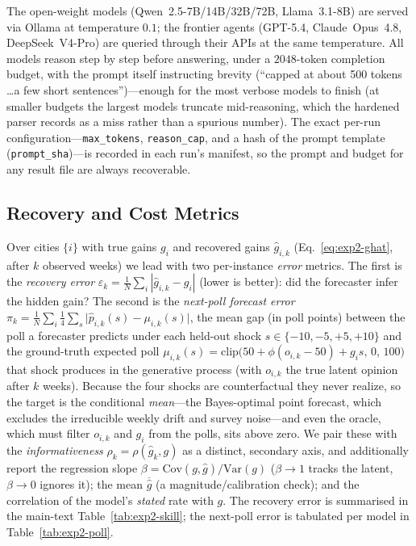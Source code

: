 The open-weight models (Qwen~2.5-7B/14B/32B/72B, Llama~3.1-8B) are served via Ollama at temperature
$0.1$; the frontier agents (GPT-5.4, Claude~Opus~4.8, DeepSeek~V4-Pro) are queried through their
APIs at the same temperature.  All models reason step by step before answering, under a $2048$-token
completion budget, with the prompt itself instructing brevity (``capped at about 500 tokens \ldots a
few short sentences'')---enough for the most verbose models to finish (at smaller budgets the largest
models truncate mid-reasoning, which the hardened parser records as a miss rather than a spurious
number).  The exact per-run configuration---\texttt{max\_tokens}, \texttt{reason\_cap}, and a hash of
the prompt template (\texttt{prompt\_sha})---is recorded in each run's manifest, so the prompt and
budget for any result file are always recoverable.

\subsection{Recovery and Cost Metrics}
\label{app:exp2-metrics}

Over cities $\{i\}$ with true gains $g_i$ and recovered gains $\hat g_{i,k}$
(Eq.~\eqref{eq:exp2-ghat}, after $k$ observed weeks) we lead with two per-instance \emph{error}
metrics.  The first is the \emph{recovery error} $\varepsilon_k=\frac1N\sum_i|\hat g_{i,k}-g_i|$
(lower is better): did the forecaster infer the hidden gain?  The second is the \emph{next-poll
forecast error} $\pi_k=\frac1N\sum_i\frac14\sum_{s}\bigl|\hat p_{i,k}(s)-\mu_{i,k}(s)\bigr|$, the
mean gap (in poll points) between the poll a forecaster predicts under each held-out shock
$s\in\{-10,-5,+5,+10\}$ and the ground-truth expected poll
$\mu_{i,k}(s)=\mathrm{clip}\bigl(50+\phi(o_{i,k}-50)+g_i s,\,0,\,100\bigr)$ that shock produces in the
generative process (with $o_{i,k}$ the true latent opinion after $k$ weeks).  Because the four shocks
are counterfactual they never realize, so the target is the conditional \emph{mean}---the
Bayes-optimal point forecast, which excludes the irreducible weekly drift and survey noise---and even
the oracle, which must filter $o_{i,k}$ and $g_i$ from the polls, sits above zero.  We pair these with
the \emph{informativeness} $\rho_k=\rho(\hat g_k,g)$ as a distinct, secondary axis, and additionally
report the regression slope $\beta=\mathrm{Cov}(g,\hat g)/\mathrm{Var}(g)$ ($\beta\!\to\!1$ tracks the
latent, $\beta\!\to\!0$ ignores it); the mean $\overline{\hat g}$ (a magnitude/calibration check); and
the correlation of the model's \emph{stated} rate with $g$.  The recovery error is summarised in the
main-text Table~\ref{tab:exp2-skill}; the next-poll error is tabulated per model in
Table~\ref{tab:exp2-poll}.


